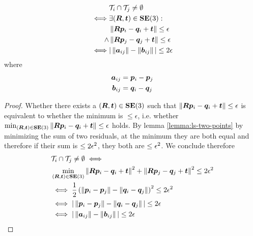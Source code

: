 \begin{theorem}
	\begin{equation}
		\begin{aligned}
			&\mathcal{T}_i \cap \mathcal{T}_j \neq \emptyset\\
			\iff &\exists ({\bm R}, \boldsymbol{t}) \in \mathbf{SE(\textrm{3})}:\\
			&\left\| {\bm R} \boldsymbol{p}_i - \boldsymbol{q}_i + \boldsymbol{t} \right\| \leq \epsilon\\
			\land &\left\| {\bm R} \boldsymbol{p}_j - \boldsymbol{q}_j + \boldsymbol{t} \right\| \leq \epsilon\\
			\iff &| \left\| \boldsymbol{a}_{ij} \right\| - \left\| \boldsymbol{b}_{ij} \right\| | \leq 2 \epsilon
		\end{aligned}
	\end{equation}
	where 
	\begin{equation}
		\label{eq:tims}
		\begin{aligned}
			\boldsymbol{a}_{ij} &= \boldsymbol{p}_i - \boldsymbol{p}_j\\
			\boldsymbol{b}_{ij} &= \boldsymbol{q}_i - \boldsymbol{q}_j
		\end{aligned}
	\end{equation}
\end{theorem}

\begin{proof}
	\label{proof:non-empty-intersection-implies-tims-compat}
	Whether there exists a $({\bm R}, \boldsymbol{t}) \in \mathbf{SE(\textrm{3})}$ such that $\left\| {\bm R} \boldsymbol{p}_i - \boldsymbol{q}_i  + \boldsymbol{t} \right\| \leq \epsilon$ is equivalent to whether the minimum is $\leq \epsilon$, i.e. whether $\min_{({\bm R}, \boldsymbol{t}) \in \mathbf{SE(\textrm{3})}} \left\| {\bm R} \boldsymbol{p}_i - \boldsymbol{q}_i  + \boldsymbol{t} \right\| \leq \epsilon$ holds.
	By lemma \ref{lemma:ls-two-points} by minimizing the sum of two residuals, at the minimum they are both equal and therefore if their sum is $\leq 2\epsilon^2$, they both are $\leq \epsilon^2$. We conclude therefore
	\begin{equation}
		\begin{aligned}
			&\mathcal{T}_i \cap \mathcal{T}_j \neq \emptyset \iff\\
			&\min_{({\bm R}, \boldsymbol{t}) \in \mathbf{SE(\textrm{3})}} \left\|{\bm R} \boldsymbol{p}_i - \boldsymbol{q}_i  + \boldsymbol{t}\right\|^2 + \left\|{\bm R} \boldsymbol{p}_j - \boldsymbol{q}_j  + \boldsymbol{t}\right\|^2 \leq 2\epsilon^2\\
			& \iff \frac{1}{2} \left( \left\| \boldsymbol{p}_i - \boldsymbol{p}_j \right\| - \left\| \boldsymbol{q}_i - \boldsymbol{q}_j \right\| \right)^2 \leq 2\epsilon^2\\
			& \iff | \left\| \boldsymbol{p}_i - \boldsymbol{p}_j \right\| - \left\| \boldsymbol{q}_i - \boldsymbol{q}_j \right\| | \leq 2\epsilon\\
			& \iff | \left\| \boldsymbol{a}_{ij} \right\| - \left\| \boldsymbol{b}_{ij} \right\| | \leq 2 \epsilon
		\end{aligned}
	\end{equation}
\end{proof}

